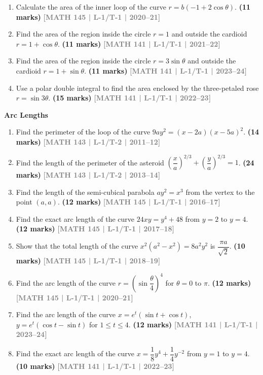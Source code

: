 \documentclass[12pt,a4paper]{article}
\newcommand{\yr}[1]{\hfill\textcolor{gray}{\small\textbf{[#1]}}}
\newcommand{\mk}[1]{\textcolor{orange!70!black}{\small\textbf{(#1 marks)}}}
\newcommand{\subtopic}[2]{%
  \vspace{10pt}
  \noindent\begin{tcolorbox}[colback=#1!8,colframe=#1,boxrule=0.6pt,arc=4pt,
    left=6pt,right=6pt,top=4pt,bottom=4pt]
    \small\bfseries\textcolor{#1}{#2}
  \end{tcolorbox}
  \vspace{2pt}
}
\begin{document}
\begin{enumerate}
\item Calculate the area of the inner loop of the curve $r=b(-1+2\cos\theta)$.
\mk{11} \yr{MATH 145 | L-1/T-1 | 2020--21}

\item Find the area of the region inside the circle $r=1$ and outside the cardioid $r=1+\cos\theta$.
\mk{11} \yr{MATH 141 | L-1/T-1 | 2021--22}

\item Find the area of the region inside the circle $r=3\sin\theta$ and outside the cardioid $r=1+\sin\theta$.
\mk{11} \yr{MATH 141 | L-1/T-1 | 2023--24}

\item Use a polar double integral to find the area enclosed by the three-petaled rose $r=\sin 3\theta$.
\mk{15} \yr{MATH 141 | L-1/T-1 | 2022--23}

\end{enumerate}

\subtopic{cB}{Arc Lengths}
\label{sub:s2-arclength}

\begin{enumerate}

\item Find the perimeter of the loop of the curve $9ay^{2}=(x-2a)(x-5a)^{2}$.
\mk{14\textonehalf} \yr{MATH 143 | L-1/T-2 | 2011--12}

\item Find the length of the perimeter of the asteroid $\left(\dfrac{x}{a}\right)^{2/3}+\left(\dfrac{y}{a}\right)^{2/3}=1$.
\mk{24\textonehalf} \yr{MATH 143 | L-1/T-2 | 2013--14}

\item Find the length of the semi-cubical parabola $ay^{2}=x^{3}$ from the vertex to the point $(a,a)$.
\mk{12} \yr{MATH 145 | L-1/T-1 | 2016--17}

\item Find the exact arc length of the curve $24xy=y^{4}+48$ from $y=2$ to $y=4$.
\mk{12} \yr{MATH 145 | L-1/T-1 | 2017--18}

\item Show that the total length of the curve $x^{2}(a^{2}-x^{2})=8a^{2}y^{2}$ is $\dfrac{\pi a}{\sqrt{2}}$.
\mk{10} \yr{MATH 145 | L-1/T-1 | 2018--19}

\item Find the arc length of the curve $r=\left(\sin\dfrac{\theta}{4}\right)^{4}$ for $\theta=0$ to $\pi$.
\mk{12} \yr{MATH 145 | L-1/T-1 | 2020--21}

\item Find the arc length of the curve $x=e^{t}(\sin t+\cos t)$, $y=e^{t}(\cos t-\sin t)$ for $1\le t\le 4$.
\mk{12} \yr{MATH 141 | L-1/T-1 | 2023--24}

\item Find the exact arc length of the curve $x=\dfrac{1}{8}y^{4}+\dfrac{1}{4}y^{-2}$ from $y=1$ to $y=4$.
\mk{10} \yr{MATH 141 | L-1/T-1 | 2022--23}

\end{enumerate}
\end{document}
